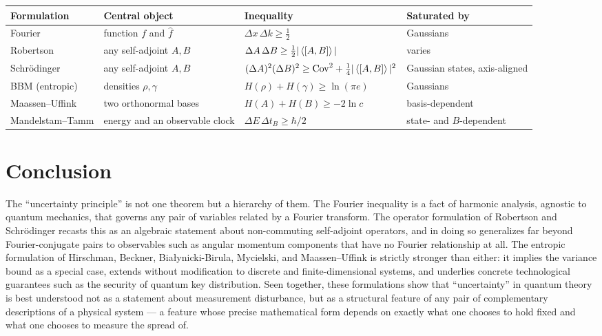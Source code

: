 \documentclass[11pt]{article}
\theoremstyle{plain}
\theoremstyle{definition}
\theoremstyle{remark}
\begin{document}
\begin{center}
\renewcommand{\arraystretch}{1.4}
\begin{tabular}{p{2.6cm}p{3.6cm}p{4.7cm}p{3.3cm}}
\toprule
\textbf{Formulation} & \textbf{Central object} & \textbf{Inequality} & \textbf{Saturated by} \\
\midrule
Fourier & function $f$ and $\hat f$ & $\Delta x\, \Delta k \geq \tfrac12$ & Gaussians \\
Robertson & any self-adjoint $A,B$ & $\Delta A\,\Delta B \geq \tfrac12|\expval{[A,B]}|$ & varies \\
Schr\"odinger & any self-adjoint $A,B$ & $(\Delta A)^2(\Delta B)^2 \geq \mathrm{Cov}^2 + \tfrac14|\expval{[A,B]}|^2$ & Gaussian states, axis-aligned \\
BBM (entropic) & densities $\rho,\gamma$ & $H(\rho)+H(\gamma) \geq \ln(\pi e)$ & Gaussians \\
Maassen--Uffink & two orthonormal bases & $H(A)+H(B) \geq -2\ln c$ & basis-dependent \\
Mandelstam--Tamm & energy and an observable clock & $\Delta E\, \Delta t_B \geq \hbar/2$ & state- and $B$-dependent \\
\bottomrule
\end{tabular}
\end{center}

\section{Conclusion}

The ``uncertainty principle'' is not one theorem but a hierarchy of them. The Fourier inequality
is a fact of harmonic analysis, agnostic to quantum mechanics, that governs any pair of variables
related by a Fourier transform. The operator formulation of Robertson and Schr\"odinger recasts
this as an algebraic statement about non-commuting self-adjoint operators, and in doing so
generalizes far beyond Fourier-conjugate pairs to observables such as angular momentum components
that have no Fourier relationship at all. The entropic formulation of Hirschman, Beckner,
Bia\l ynicki-Birula, Mycielski, and Maassen--Uffink is strictly stronger than either: it implies
the variance bound as a special case, extends without modification to discrete and
finite-dimensional systems, and underlies concrete technological guarantees such as the security
of quantum key distribution. Seen together, these formulations show that ``uncertainty'' in
quantum theory is best understood not as a statement about measurement disturbance, but as a
structural feature of any pair of complementary descriptions of a physical system --- a feature
whose precise mathematical form depends on exactly what one chooses to hold fixed and what one
chooses to measure the spread of.
\end{document}
